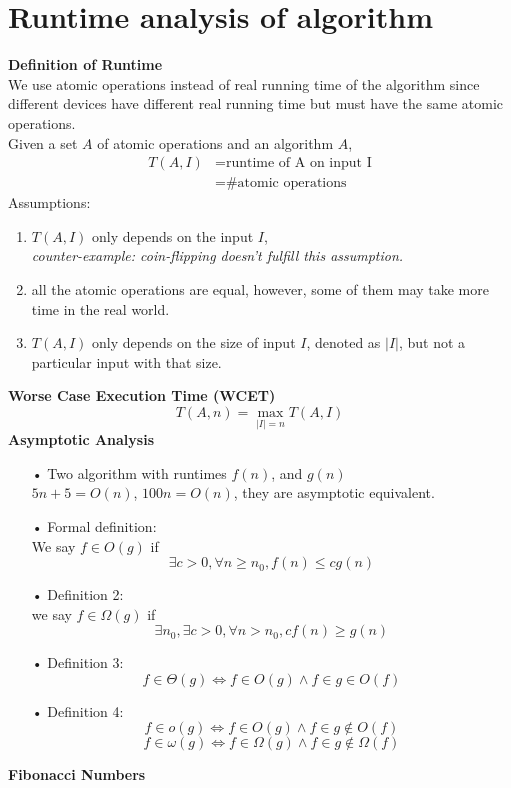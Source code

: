 \documentclass[11pt]{article}
\begin{document}
\tableofcontents
\section{Runtime analysis of algorithm}
\textbf{Definition of Runtime}\\
We use atomic operations instead of real running time of the algorithm since different devices have different real running time but must have the same atomic operations.\\
Given a set $A$ of atomic operations and an algorithm $A$,
\begin{align*}
T(A, I)&= \text{runtime of A on input I}\\
&= \text{\# atomic operations}
\end{align*}
Assumptions:
\begin{enumerate}
\item $T(A, I)$ only depends on the input $I$, \\\textit{counter-example: coin-flipping doesn't fulfill this assumption.}
\item all the atomic operations are equal, however, some of them may take more time in the real world.
\item $T(A, I)$ only depends on the size of input $I$, denoted as $|I|$, but not a particular input with that size.
\end{enumerate}
\textbf{Worse Case Execution Time (WCET)}
$$T(A, n) = \max_{|I|=n} T(A, I)$$
\textbf{Asymptotic Analysis}
\begin{enumerate}
\item[•] Two algorithm with runtimes $f(n)$, and $g(n)$\\
$5n + 5 = O(n)$, $100n = O(n)$, they are asymptotic equivalent.
\item[•] Formal definition: \\We say $f \in O(g)$ if $$\exists c>0, \forall n \geq n_{0}, f(n) \leq   c g(n)$$
\item[•] Definition 2:\\ we say $f \in \Omega (g)$ if $$\exists n_{0}, \exists c>0, \forall n > n_{0}, c f(n) \geq g(n)$$
\item[•] Definition 3: $$f \in \Theta(g) \iff f\in O(g) \wedge f \in g \in O(f)$$
\item[•] Definition 4: $$f \in o(g) \iff f\in O(g) \wedge f \in g \notin O(f)$$ $$f \in \omega(g) \iff f\in \Omega(g) \wedge f \in g \notin \Omega(f)$$
\end{enumerate}
\textbf{Fibonacci Numbers}\\
\end{document}
